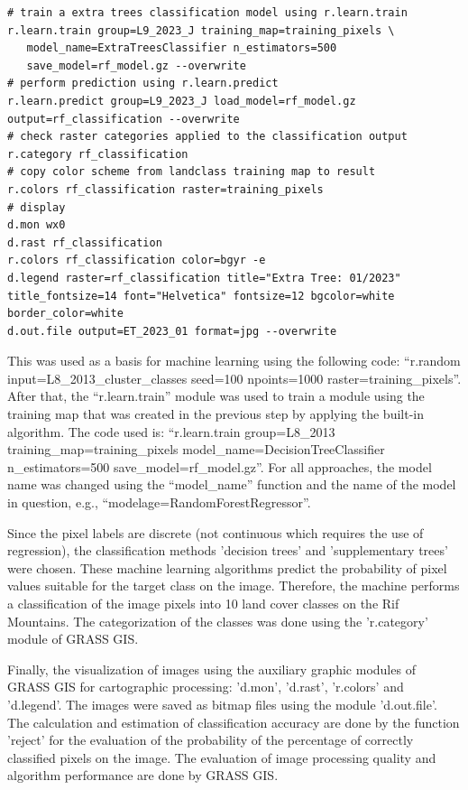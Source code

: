 \documentclass[geomatics,article,submit,pdftex,moreauthors]{Definitions/mdpi}
\begin{document}
\begin{footnotesize}
\begin{verbatim}
# train a extra trees classification model using r.learn.train
r.learn.train group=L9_2023_J training_map=training_pixels \
   model_name=ExtraTreesClassifier n_estimators=500 
   save_model=rf_model.gz --overwrite
# perform prediction using r.learn.predict
r.learn.predict group=L9_2023_J load_model=rf_model.gz  output=rf_classification --overwrite
# check raster categories applied to the classification output
r.category rf_classification
# copy color scheme from landclass training map to result
r.colors rf_classification raster=training_pixels
# display
d.mon wx0
d.rast rf_classification
r.colors rf_classification color=bgyr -e
d.legend raster=rf_classification title="Extra Tree: 01/2023" 
title_fontsize=14 font="Helvetica" fontsize=12 bgcolor=white 
border_color=white
d.out.file output=ET_2023_01 format=jpg --overwrite
\end{verbatim}
\end{footnotesize}

This was used as a basis for machine learning using the following code: “r.random input=L8\_2013\_cluster\_classes seed=100 npoints=1000 raster=training\_pixels”. After that, the “r.learn.train” module was used to train a module using the training map that was created in the previous step by applying the built-in algorithm. The code used is: “r.learn.train group=L8\_2013 training\_map=training\_pixels model\_name=DecisionTreeClassifier n\_estimators=500 save\_model=rf\_model.gz”. For all approaches, the model name was changed using the “model\_name” function and the name of the model in question, e.g., “modelage=RandomForestRegressor”.

Since the pixel labels are discrete (not continuous which requires the use of regression), the classification methods 'decision trees' and 'supplementary trees' were chosen. These machine learning algorithms predict the probability of pixel values suitable for the target class on the image. Therefore, the machine performs a classification of the image pixels into 10 land cover classes on the Rif Mountains. The categorization of the classes was done using the 'r.category' module of GRASS GIS. 

Finally, the visualization of images using the auxiliary graphic modules of GRASS GIS for cartographic processing: 'd.mon', 'd.rast', 'r.colors' and 'd.legend'. The images were saved as bitmap files using the module 'd.out.file'. The calculation and estimation of classification accuracy are done by the function 'reject' for the evaluation of the probability of the percentage of correctly classified pixels on the image. The evaluation of image processing quality and algorithm performance are done by GRASS GIS.
\end{document}
